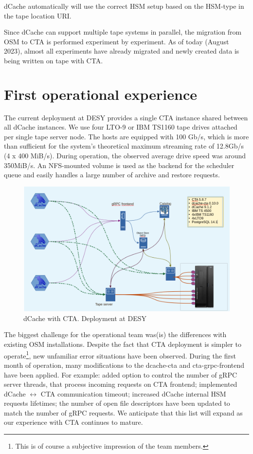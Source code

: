 \documentclass{webofc}
\begin{document}
dCache automatically will use the correct HSM setup based on the HSM-type in the tape location URI.

Since dCache can support multiple tape systems in parallel, the migration from OSM to CTA is performed experiment by experiment. As of today (August 2023), almost all experiments have already migrated and newly created data is being written on tape with CTA.

\section{First operational experience}
\label{experence}

The current deployment at DESY provides a single CTA instance shared between all dCache instances. We use four LTO-9 or IBM TS1160 tape drives attached per single tape server node. The hosts are equipped with 100 Gb/s, which is more than sufficient for the system's theoretical maximum streaming rate of 12.8Gb/s (4 x 400 MiB/s). During operation, the observed average drive speed was around 350MiB/s.  An NFS-mounted volume is used as the backend for the scheduler queue and easily handles a large number of archive and restore requests.

\begin{figure}[h]
    \centering
    \includegraphics[scale=0.30 ]{cta-deployment-desy.png}
    \caption{dCache with CTA. Deployment at DESY}
    \label{fig:dcache_cta_deplyment}
\end{figure}

The biggest challenge for the operational team was(is) the differences with existing OSM installations. Despite the fact that CTA deployment is simpler to operate\footnote{This is of course a subjective impression of the team members.}, new unfamiliar error situations have been observed. During the first month of operation, many modifications to the dcache-cta and cta-grpc-frontend have been applied. For example: added option to control the number of gRPC server threads, that process incoming requests on CTA frontend; implemented dCache $\leftrightarrow$ CTA communication timeout; increased dCache internal HSM requests lifetimes; the number of open file descriptors have been updated to match the number of gRPC requests. We anticipate that this list will expand as our experience with CTA continues to mature.
\end{document}
